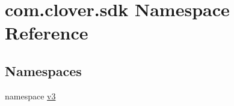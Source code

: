 \hypertarget{namespacecom_1_1clover_1_1sdk}{}\section{com.\+clover.\+sdk Namespace Reference}
\label{namespacecom_1_1clover_1_1sdk}
\subsection*{Namespaces}
\begin{DoxyCompactItemize}
\item 
namespace \hyperlink{namespacecom_1_1clover_1_1sdk_1_1v3}{v3}
\end{DoxyCompactItemize}
